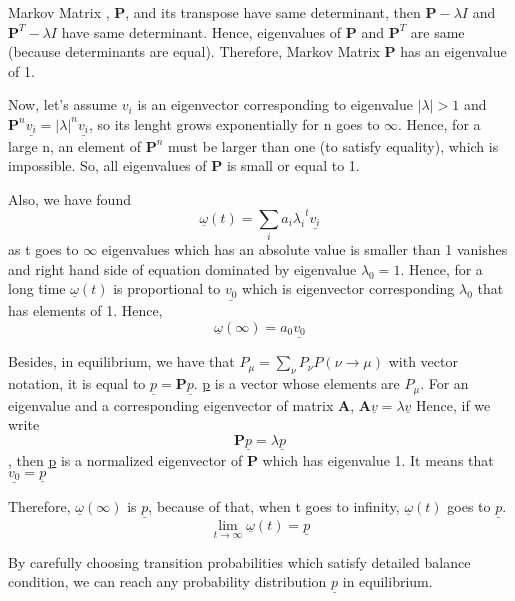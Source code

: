 \documentclass[12pt,fleqn]{report}
\begin{document}
\begin{enumerate}
Markov Matrix , \textbf{P}, and its transpose have same determinant, then  $\textbf{P} - \lambda I $ and $ \textbf{P}^T - \lambda I $ have same determinant. Hence, eigenvalues of \textbf{P} and $\textbf{P}^T $ are same (because determinants are equal). Therefore, Markov Matrix \textbf{P} has an eigenvalue of 1.

Now, let's assume $v_i$ is an eigenvector corresponding to eigenvalue $| \lambda| > 1$ and $\textbf{P}^n \underline{v_i} =  | \lambda |^n \underline{v_i} $, so its lenght grows exponentially for n goes to $\infty$. Hence, for a large n, an element of $\textbf{P}^n$ must be larger than one (to satisfy equality), which is impossible. So, all eigenvalues of \textbf{P} is small or equal to 1.

Also, we have found $$ \underline{\omega}(t) = \sum\limits_{i} a_i {\lambda_i}^t \underline{v_i} $$ as t goes to $\infty$ eigenvalues which has an absolute value is smaller than 1 vanishes and right hand side of equation dominated by eigenvalue $\lambda_0 = 1 $. Hence, for a long time $\underline{\omega}(t)$ is proportional to $\underline{v_0}$ which is eigenvector corresponding $\lambda_0$ that has elements of 1. Hence,
\begin{equation}
 \underline{\omega}(\infty) = a_0 \underline{v_0}
\end{equation}

Besides, in equilibrium, we have that $P_\mu = \sum\limits_{\nu} P_\nu P(\nu \rightarrow \mu)$ with vector notation, it is equal to $\underline{p} = \textbf{P} \underline{p}$. \underline{p} is a vector whose elements are $P_\mu$. For an eigenvalue and a corresponding eigenvector of matrix \textbf{A}, $\textbf{A} \underline{v} = \lambda \underline{v}$ Hence, if we write $$\textbf{P} \underline{p} = \lambda \underline{p} $$, then \underline{p} is a normalized eigenvector of \textbf{P} which has eigenvalue 1. It means that $\underline{v_0} = \underline{p}$


Therefore, $\underline{\omega}(\infty) $ is $\underline{p}$, because of that, when t goes to infinity, $\underline{\omega}(t)$ goes to $\underline{p}$.
\begin{equation}
\lim_{t \rightarrow \infty} \underline{\omega}(t) = \underline{p}
\end{equation}



By carefully choosing transition probabilities which satisfy detailed balance condition, we can reach any probability distribution $\underline{p}$ in equilibrium.



\end{enumerate}
\end{document}
